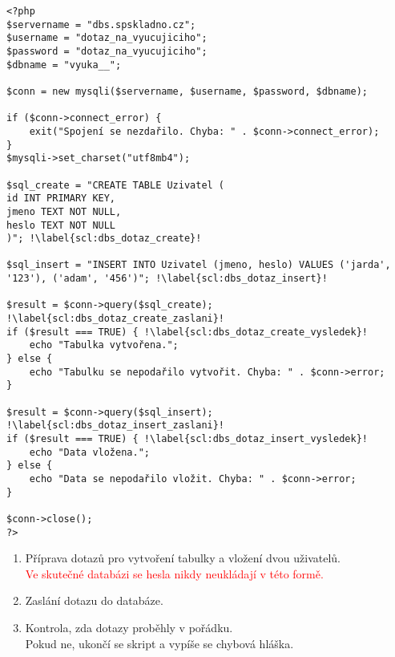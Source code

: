 \begin{minipage}[t]{.45\textwidth}
\begin{code}
\begin{verbatim}
<?php
$servername = "dbs.spskladno.cz"; 
$username = "dotaz_na_vyucujiciho";
$password = "dotaz_na_vyucujiciho";
$dbname = "vyuka__";

$conn = new mysqli($servername, $username, $password, $dbname); 

if ($conn->connect_error) { 
    exit("Spojení se nezdařilo. Chyba: " . $conn->connect_error);
}
$mysqli->set_charset("utf8mb4");

$sql_create = "CREATE TABLE Uzivatel ( 
id INT PRIMARY KEY,
jmeno TEXT NOT NULL,
heslo TEXT NOT NULL
)"; !\label{scl:dbs_dotaz_create}!

$sql_insert = "INSERT INTO Uzivatel (jmeno, heslo) VALUES ('jarda', '123'), ('adam', '456')"; !\label{scl:dbs_dotaz_insert}!

$result = $conn->query($sql_create); !\label{scl:dbs_dotaz_create_zaslani}!
if ($result === TRUE) {	!\label{scl:dbs_dotaz_create_vysledek}!
    echo "Tabulka vytvořena.";
} else {
    echo "Tabulku se nepodařilo vytvořit. Chyba: " . $conn->error;
}

$result = $conn->query($sql_insert); !\label{scl:dbs_dotaz_insert_zaslani}!
if ($result === TRUE) {	!\label{scl:dbs_dotaz_insert_vysledek}!
    echo "Data vložena.";
} else {
    echo "Data se nepodařilo vložit. Chyba: " . $conn->error;
}

$conn->close();
?> 
\end{verbatim}

\label{code:php_dbs_create_insert}
\end{code}
\end{minipage}
\begin{minipage}[t]{.45\textwidth}
\begin{enumerate}
\item[ř. \ref{scl:dbs_dotaz_create}, \ref{scl:dbs_dotaz_insert}:] Příprava dotazů pro vytvoření tabulky a vložení dvou uživatelů.\\
\textcolor{red}{Ve skutečné databázi se hesla nikdy neukládají v této  formě.}
\item[ř. \ref{scl:dbs_dotaz_create_zaslani}, \ref{scl:dbs_dotaz_insert_zaslani}:] Zaslání dotazu do databáze.
\vspace{3.5cm}
\item[ř. \ref{scl:dbs_dotaz_create_vysledek}, \ref{scl:dbs_dotaz_insert_vysledek}:] Kontrola, zda dotazy proběhly v pořádku.\\
Pokud ne, ukončí se skript a vypíše se chybová hláška.
\end{enumerate}
\end{minipage}


